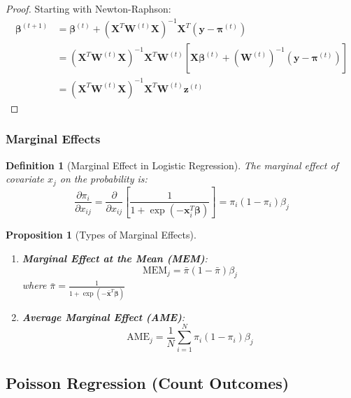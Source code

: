 \documentclass{article}
\newtheorem{definition}{Definition}
\newtheorem{proposition}{Proposition}
\begin{document}
\begin{proof}
Starting with Newton-Raphson:
\begin{align}
\boldsymbol{\beta}^{(t+1)} &= \boldsymbol{\beta}^{(t)} + (\mathbf{X}^T\mathbf{W}^{(t)}\mathbf{X})^{-1}\mathbf{X}^T(\mathbf{y} - \boldsymbol{\pi}^{(t)}) \\
&= (\mathbf{X}^T\mathbf{W}^{(t)}\mathbf{X})^{-1}\mathbf{X}^T\mathbf{W}^{(t)}[\mathbf{X}\boldsymbol{\beta}^{(t)} + (\mathbf{W}^{(t)})^{-1}(\mathbf{y} - \boldsymbol{\pi}^{(t)})] \\
&= (\mathbf{X}^T\mathbf{W}^{(t)}\mathbf{X})^{-1}\mathbf{X}^T\mathbf{W}^{(t)}\mathbf{z}^{(t)}
\end{align}
\end{proof}

\subsubsection{Marginal Effects}

\begin{definition}[Marginal Effect in Logistic Regression]
The marginal effect of covariate $x_j$ on the probability is:
\begin{equation}
\frac{\partial \pi_i}{\partial x_{ij}} = \frac{\partial}{\partial x_{ij}}\left[\frac{1}{1 + \exp(-\mathbf{x}_i^T\boldsymbol{\beta})}\right] = \pi_i(1-\pi_i)\beta_j
\end{equation}
\end{definition}

\begin{proposition}[Types of Marginal Effects]
\begin{enumerate}
    \item \textbf{Marginal Effect at the Mean (MEM)}:
    \begin{equation}
    \text{MEM}_j = \bar{\pi}(1-\bar{\pi})\beta_j
    \end{equation}
    where $\bar{\pi} = \frac{1}{1 + \exp(-\bar{\mathbf{x}}^T\boldsymbol{\beta})}$
    
    \item \textbf{Average Marginal Effect (AME)}:
    \begin{equation}
    \text{AME}_j = \frac{1}{N}\sum_{i=1}^N \pi_i(1-\pi_i)\beta_j
    \end{equation}
\end{enumerate}
\end{proposition}

\subsection{Poisson Regression (Count Outcomes)}
\end{document}
